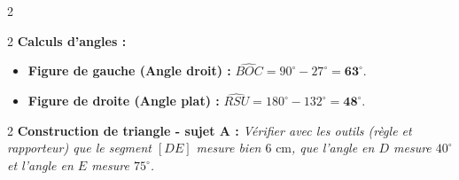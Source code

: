 \documentclass[a4paper]{book}
\begin{document}
{\begin{exerciceNote}{2}
        \begin{center}
        \end{center}
    \end{exerciceNote}

        
    \begin{exerciceNote}{2}
        \textbf{Calculs d'angles :}
        \begin{itemize}
            \item \textbf{Figure de gauche (Angle droit) :} $\widehat{BOC} = 90^\circ - 27^\circ = \mathbf{63^\circ}$.
            \item \textbf{Figure de droite (Angle plat) :} $\widehat{RSU} = 180^\circ - 132^\circ = \mathbf{48^\circ}$.
        \end{itemize}
    \end{exerciceNote}

\newpage

    \setcounter{exo}{6}
    \begin{exerciceNote}{2}
        \textbf{Construction de triangle - sujet A :} \textit{Vérifier avec les outils (règle et rapporteur) que le segment $[DE]$ mesure bien $6\text{ cm}$, que l'angle en $D$ mesure $40^\circ$ et l'angle en $E$ mesure $75^\circ$.}
    

\end{exerciceNote}}
\end{document}
